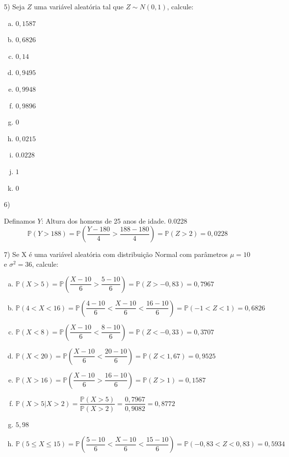 \documentclass[12pt]{article}
\begin{document}
\vspace{3px}

5) Seja $Z$ uma variável aleatória tal que $Z\sim N(0,1)$, calcule:

\begin{enumerate}[a)]
    \item $0,1587$
    \item $0,6826$
    \item $0,14$
    \item $0,9495$
    \item $0,9948$
    \item $0,9896$
    \item $0$
    \item $0,0215$
    \item $0.0228$
    \item $1$
    \item $0$
\end{enumerate}

\vspace{3px}

6) 

Definamos $Y$: Altura dos homens de 25 anos de idade. 
0.0228
$$\mathds{P}(Y > 188) = \mathds{P}\left(\dfrac{Y - 180}{4} > \dfrac{188 - 180}{4}\right) = \mathds{P}(Z > 2) = 0,0228$$

\vspace{3px}


7) Se X é uma variável aleatória com distribuição Normal com parâmetros $\mu=10$ e $\sigma^2=36$, calcule:

\begin{enumerate}[a)]
    \item $\mathds{P}(X>5) = \mathds{P}\left(\dfrac{X - 10}{6}>\dfrac{5 - 10}{6}\right) = \mathds{P}(Z > -0,83) = 0,7967 $
    \item $\mathds{P}(4<X<16) =  \mathds{P}\left(\dfrac{4 - 10}{6}<\dfrac{X - 10}{6}<\dfrac{16 - 10}{6}\right) = \mathds{P}(-1< Z < 1) = 0,6826 $
    \item $\mathds{P}(X<8) = \mathds{P}\left(\dfrac{X - 10}{6}<\dfrac{8 - 10}{6}\right) = \mathds{P}(Z < -0,33) = 0,3707 $
    \item $\mathds{P}(X<20) = \mathds{P}\left(\dfrac{X - 10}{6}<\dfrac{20 - 10}{6}\right) = \mathds{P}(Z < 1,67) = 0,9525$
    \item $\mathds{P}(X>16)=\mathds{P}\left(\dfrac{X - 10}{6}>\dfrac{16 - 10}{6}\right) = \mathds{P}(Z > 1) = 0,1587$
    \item $\mathds{P}(X>5 | X> 2) = \dfrac{\mathds{P}(X>5) }{\mathds{P}(X>2) } = \dfrac{0,7967}{0,9082} = 0,8772 $
    \item $5,98$
    \item $\mathds{P}(5\leq X \leq 15) = \mathds{P}\left(\dfrac{5 - 10}{6}<\dfrac{X - 10}{6}<\dfrac{15 - 10}{6}\right) = \mathds{P}(-0,83< Z < 0,83) = 0,5934$
\end{enumerate}
\end{document}
